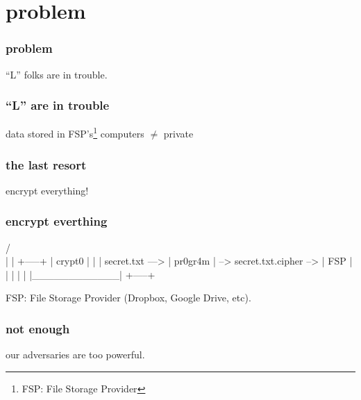 
\section{problem}

\begin{frame}
  \frametitle{problem}
  \centering
  ``L'' folks are in trouble.
\end{frame}

\begin{frame}
  \frametitle{``L'' are in trouble}
  \centering
  data stored in FSP's\footnote{FSP: File Storage Provider} computers $\ne$ private
\end{frame}

\begin{frame}
  \frametitle{the last resort}
  \centering
  encrypt everything!
\end{frame}

\begin{frame}[fragile]
  \frametitle{encrypt everthing}
  {\tiny
  \begin{semiverbatim}
                        /^^^^^^^^^^^^\\
                        |            |                           +-----+
                        |  crypt0    |                           |     |
        secret.txt ---> |  pr0gr4m   | --> secret.txt.cipher --> | FSP |
                        |            |                           |     |
                        |____________|                           +-----+

     FSP: File Storage Provider (Dropbox, Google Drive, etc).
  \end{semiverbatim}
  }
\end{frame}


\begin{frame}
  \frametitle{not enough}
  \centering
  our adversaries are too powerful.
\end{frame}


